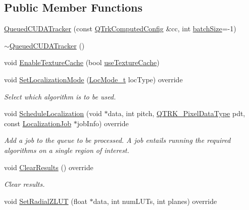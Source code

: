 \subsection*{Public Member Functions}
\begin{DoxyCompactItemize}
\item 
\hyperlink{class_queued_c_u_d_a_tracker_a1e6e7939fc282165efd3adb6ace86ef3}{Queued\+C\+U\+D\+A\+Tracker} (const \hyperlink{struct_q_trk_computed_config}{Q\+Trk\+Computed\+Config} \&cc, int \hyperlink{class_queued_c_u_d_a_tracker_a19a027c0cc319821c25de1cb23e14a17}{batch\+Size}=-\/1)
\item 
\hyperlink{class_queued_c_u_d_a_tracker_a0f7eaa0256e08ffae8b2af55685ce285}{$\sim$\+Queued\+C\+U\+D\+A\+Tracker} ()
\item 
void \hyperlink{class_queued_c_u_d_a_tracker_ab6bc66ca515095c58e92db3a426f3cc3}{Enable\+Texture\+Cache} (bool \hyperlink{class_queued_c_u_d_a_tracker_a1351abd5ca987de1b8663a919e511134}{use\+Texture\+Cache})
\item 
void \hyperlink{class_queued_c_u_d_a_tracker_aed4058f411c99625b9c06ce13d4aabc6}{Set\+Localization\+Mode} (\hyperlink{qtrk__c__api_8h_a6ba72ec1daa19642f85a47defe8f0812}{Loc\+Mode\+\_\+t} loc\+Type) override
\begin{DoxyCompactList}\small\item\em Select which algorithm is to be used. \end{DoxyCompactList}\item 
void \hyperlink{class_queued_c_u_d_a_tracker_a8a038919d270228922e31f375c17cbbe}{Schedule\+Localization} (void $\ast$data, int pitch, \hyperlink{qtrk__c__api_8h_aad82367b3ea592a142bb50a2fb538b0b}{Q\+T\+R\+K\+\_\+\+Pixel\+Data\+Type} pdt, const \hyperlink{struct_localization_job}{Localization\+Job} $\ast$job\+Info) override
\begin{DoxyCompactList}\small\item\em Add a job to the queue to be processed. A job entails running the required algorithms on a single region of interest. \end{DoxyCompactList}\item 
void \hyperlink{class_queued_c_u_d_a_tracker_a41b207c9abf386f57ab9f99994e92b4c}{Clear\+Results} () override
\begin{DoxyCompactList}\small\item\em Clear results. \end{DoxyCompactList}\item 
void \hyperlink{class_queued_c_u_d_a_tracker_a2681f4f94ca93970322bafa58b1dd9bd}{Set\+Radial\+Z\+L\+UT} (float $\ast$data, int num\+L\+U\+Ts, int planes) override

\end{DoxyCompactItemize}
